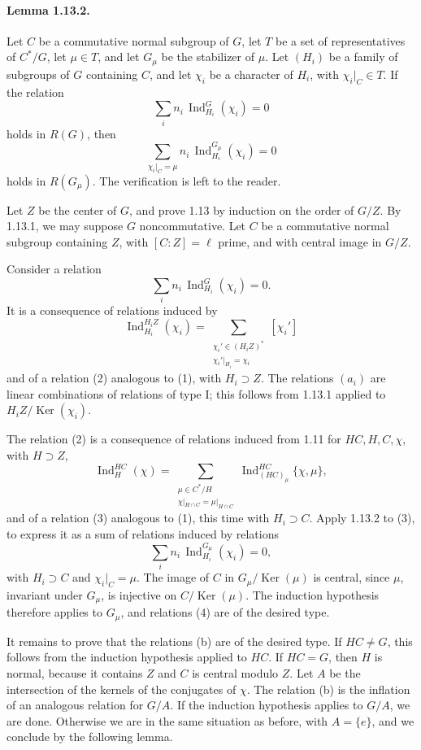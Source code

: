 \documentclass[10pt,letterpaper]{article}
\newcommand{\Ind}{\operatorname{Ind}}
\providecommand{\Ker}{\operatorname{Ker}}
\providecommand{\Ind}{\operatorname{Ind}}
\providecommand{\Ker}{\operatorname{Ker}}
\begin{document}
\paragraph{Lemma 1.13.2.} Let \(C\) be a commutative normal subgroup of \(G\), let \(T\) be a set of representatives of \(C^*/G\), let \(\mu\in T\), and let \(G_\mu\) be the stabilizer of \(\mu\). Let \((H_i)\) be a family of subgroups of \(G\) containing \(C\), and let \(\chi_i\) be a character of \(H_i\), with \(\chi_i|_C\in T\). If the relation
\[
\sum_i n_i\,\Ind_{H_i}^G(\chi_i)=0
\]
holds in \(R(G)\), then
\[
\sum_{\chi_i|_C=\mu}
n_i\,\Ind_{H_i}^{G_\mu}(\chi_i)=0
\]
holds in \(R(G_\mu)\). The verification is left to the reader.

Let \(Z\) be the center of \(G\), and prove 1.13 by induction on the order of \(G/Z\). By 1.13.1, we may suppose \(G\) noncommutative. Let \(C\) be a commutative normal subgroup containing \(Z\), with \([C:Z]=\ell\) prime, and with central image in \(G/Z\).

Consider a relation
\[
\tag{1}
\sum_i n_i\,\Ind_{H_i}^G(\chi_i)=0.
\]
It is a consequence of relations induced by
\[
\tag{$a_i$}
\Ind_{H_i}^{H_iZ}(\chi_i)=
\sum_{\substack{\chi_i'\in(H_iZ)^*\\ \chi_i'|_{H_i}=\chi_i}}[\chi_i']
\]
and of a relation (2) analogous to (1), with \(H_i\supset Z\). The relations \((a_i)\) are linear combinations of relations of type I; this follows from 1.13.1 applied to \(H_iZ/\Ker(\chi_i)\).

The relation (2) is a consequence of relations induced from 1.11 for \(HC,H,C,\chi\), with \(H\supset Z\),
\[
\tag{b}
\Ind_H^{HC}(\chi)=
\sum_{\substack{\mu\in C^*/H\\ \chi|_{H\cap C}=\mu|_{H\cap C}}}
\Ind_{(HC)_\mu}^{HC}\{\chi,\mu\},
\]
and of a relation (3) analogous to (1), this time with \(H_i\supset C\). Apply 1.13.2 to (3), to express it as a sum of relations induced by relations
\[
\tag{4}
\sum_i n_i\,\Ind_{H_i}^{G_\mu}(\chi_i)=0,
\]
with \(H_i\supset C\) and \(\chi_i|_C=\mu\). The image of \(C\) in \(G_\mu/\Ker(\mu)\) is central, since \(\mu\), invariant under \(G_\mu\), is injective on \(C/\Ker(\mu)\). The induction hypothesis therefore applies to \(G_\mu\), and relations (4) are of the desired type.

It remains to prove that the relations (b) are of the desired type. If \(HC\ne G\), this follows from the induction hypothesis applied to \(HC\). If \(HC=G\), then \(H\) is normal, because it contains \(Z\) and \(C\) is central modulo \(Z\). Let \(A\) be the intersection of the kernels of the conjugates of \(\chi\). The relation (b) is the inflation of an analogous relation for \(G/A\). If the induction hypothesis applies to \(G/A\), we are done. Otherwise we are in the same situation as before, with \(A=\{e\}\), and we conclude by the following lemma.
\end{document}
